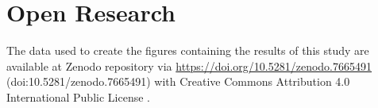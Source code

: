\documentclass[draft]{agujournal2019}
\begin{document}


%
%
%
%

%
%

%

%


\section{Open Research}
The data used to create the figures containing the results of this study are available at Zenodo repository via \url{https://doi.org/10.5281/zenodo.7665491} (doi:10.5281/zenodo.7665491) with Creative Commons Attribution 4.0 International Public License \cite{edith_sotelo_2023_7665491}.
\end{document}
